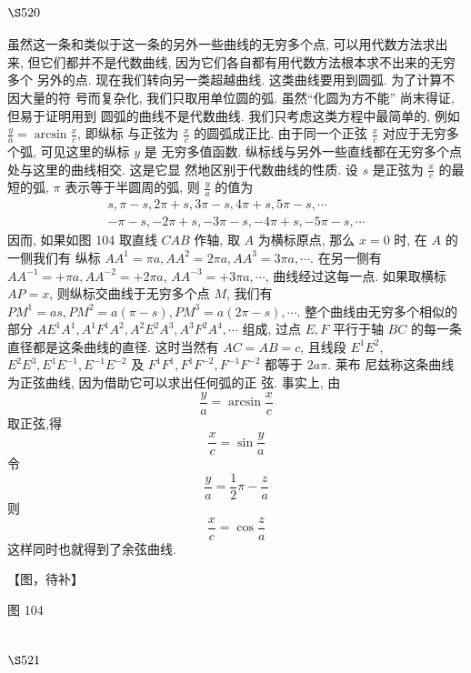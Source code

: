 \section{$\S 520$}

虽然这一条和类似于这一条的另外一些曲线的无穷多个点, 可以用代数方法求出 来, 但它们都并不是代数曲线, 因为它们各自都有用代数方法根本求不出来的无穷多个 另外的点. 现在我们转向另一类超越曲线. 这类曲线要用到圆弧. 为了计算不因大量的符 号而复杂化, 我们只取用单位圆的弧. 虽然“化圆为方不能” 尚末得证, 但易于证明用到 圆弧的曲线不是代数曲线. 我们只考虑这类方程中最简单的, 例如 $\frac{y}{a}=\arcsin \frac{x}{c}$, 即纵标 与正弦为 $\frac{x}{c}$ 的圆弧成正比. 由于同一个正弦 $\frac{x}{c}$ 对应于无穷多个弧, 可见这里的纵标 $y$ 是 无穷多值函数. 纵标线与另外一些直线都在无穷多个点处与这里的曲线相交. 这是它显 然地区别于代数曲线的性质. 设 $s$ 是正弦为 $\frac{x}{c}$ 的最短的弧, $\pi$ 表示等于半圆周的弧, 则 $\frac{y}{a}$ 的值为
\[
\begin{gathered}
s, \pi-s, 2 \pi+s, 3 \pi-s, 4 \pi+s, 5 \pi-s, \cdots \\
-\pi-s,-2 \pi+s,-3 \pi-s,-4 \pi+s,-5 \pi-s, \cdots
\end{gathered}
\]
因而, 如果如图 104 取直线 $C A B$ 作轴, 取 $A$ 为横标原点, 那么 $x=0$ 时, 在 $A$ 的一侧我们有 纵标 $A A^{1}=\pi a, A A^{2}=2 \pi a, A A^{3}=3 \pi a, \cdots$. 在另一侧有 $A A^{-1}=+\pi a, A A^{-2}=+2 \pi a$, $A A^{-3}=+3 \pi a, \cdots$, 曲线经过这每一点. 如果取横标 $A P=x$, 则纵标交曲线于无穷多个点 $M$, 我们有 $P M^{1}=a s, P M^{2}=a(\pi-s), P M^{3}=a(2 \pi-s), \cdots$. 整个曲线由无穷多个相似的 部分 $A E^{1} A^{1}, A^{1} F^{1} A^{2}, A^{2} E^{2} A^{3}, A^{3} F^{2} A^{4}, \cdots$ 组成, 过点 $E, F$ 平行于轴 $B C$ 的每一条直径都是这条曲线的直径. 这时当然有 $A C=A B=c$, 且线段 $E^{1} E^{2}$, $E^{2} E^{3}, E^{1} E^{-1}, E^{-1} E^{-2}$ 及 $F^{1} F^{1}, F^{1} F^{-2}, F^{-1} F^{-2}$ 都等于 $2 a \pi$. 莱布 尼兹称这条曲线为正弦曲线, 因为借助它可以求出任何弧的正 弦. 事实上, 由
\[
\frac{y}{a}=\arcsin \frac{x}{c}
\]
取正弦,得
\[
\frac{x}{c}=\sin \frac{y}{a}
\]
令
\[
\frac{y}{a}=\frac{1}{2} \pi-\frac{z}{a}
\]
则
\[
\frac{x}{c}=\cos \frac{z}{a}
\]
这样同时也就得到了余弦曲线.


【图，待补】

图 104

\section{$\S 521$}

